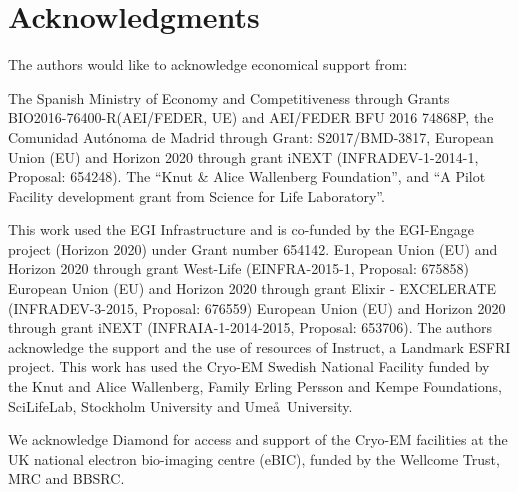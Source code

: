 \section{Acknowledgments}

The authors would like to acknowledge economical support from:

The Spanish Ministry of Economy and Competitiveness through Grants BIO2016-76400-R(AEI/FEDER, UE) and AEI/FEDER BFU 2016 74868P, the Comunidad Aut\'{o}noma de Madrid through Grant: S2017/BMD-3817, European Union (EU) and Horizon 2020 through grant iNEXT (INFRADEV-1-2014-1, Proposal: 654248). The ``Knut \& Alice Wallenberg Foundation'', and ``A Pilot Facility development grant from Science for Life Laboratory''. 

This work used the EGI Infrastructure and is co-funded by the EGI-Engage project (Horizon 2020) under Grant number 654142. European Union (EU) and Horizon 2020 through grant West-Life (EINFRA-2015-1, Proposal: 675858) European Union (EU) and Horizon 2020 through grant Elixir - EXCELERATE (INFRADEV-3-2015, Proposal: 676559) European Union (EU) and Horizon 2020 through grant iNEXT (INFRAIA-1-2014-2015, Proposal: 653706). The authors acknowledge the support and the use of resources of Instruct, a Landmark ESFRI project. This work has used the Cryo-EM Swedish National Facility funded by the Knut and Alice Wallenberg, Family Erling Persson and Kempe Foundations, SciLifeLab, Stockholm University and Ume\aa\ University.

We acknowledge Diamond for access and support of the Cryo-EM facilities at the UK national electron bio-imaging centre (eBIC), funded by the Wellcome Trust, MRC and BBSRC.





